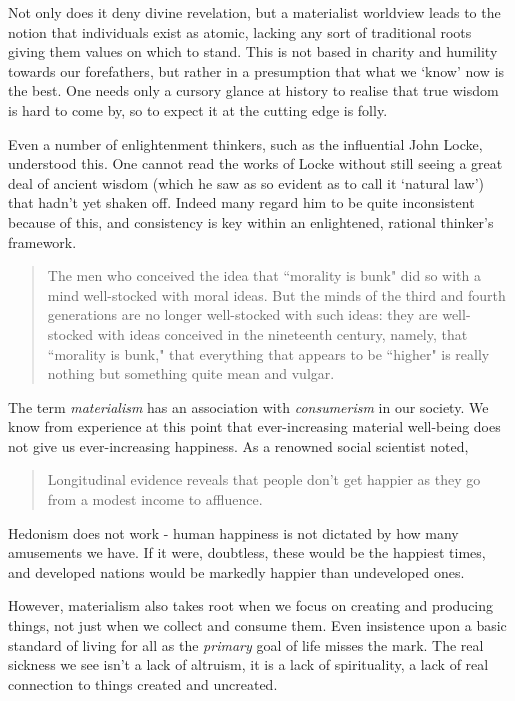 \documentclass[letterpaper]{article}
\begin{document}
Not only does it deny divine revelation, but a materialist worldview leads to the notion that individuals exist as atomic, lacking any sort of traditional roots giving them values on which to stand. This is not based in charity and humility towards our forefathers, but rather in a presumption that what we `know' now is the best. One needs only a cursory glance at history to realise that true wisdom is hard to come by, so to expect it at the cutting edge is folly.

Even a number of enlightenment thinkers, such as the influential John Locke, understood this. One cannot read the works of Locke without still seeing a great deal of ancient wisdom (which he saw as so evident as to call it `natural law') that hadn't yet shaken off. Indeed many regard him to be quite inconsistent because of this, and consistency is key within an enlightened, rational thinker's framework.

\begin{quote}
  The men who conceived the idea that ``morality is bunk" did so with a mind well-stocked with moral ideas. But the minds of the third and fourth generations are no longer well-stocked with such ideas: they are well-stocked with ideas conceived in the nineteenth century, namely, that ``morality is bunk," that everything that appears to be ``higher" is really nothing but something quite mean and vulgar.
\end{quote}

The term \textit{materialism} has an association with \textit{consumerism} in our society. We know from experience at this point that ever-increasing material well-being does not give us ever-increasing happiness. As a renowned social scientist noted,

\begin{quote}
  Longitudinal evidence reveals that people don't get happier as they go from a modest income to affluence.
\end{quote}

Hedonism does not work - human happiness is not dictated by how many amusements we have. If it were, doubtless, these would be the happiest times, and developed nations would be markedly happier than undeveloped ones.

However, materialism also takes root when we focus on creating and producing things, not just when we collect and consume them. Even insistence upon a basic standard of living for all as the \textit{primary} goal of life misses the mark. The real sickness we see isn't a lack of altruism, it is a lack of spirituality, a lack of real connection to things created and uncreated.
\end{document}
